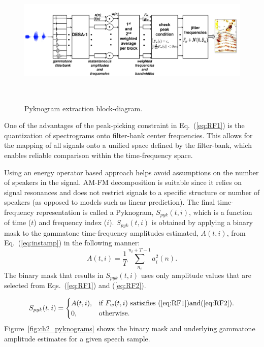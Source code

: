 {\begin{figure}[h!]
	\centering
	\vspace{0mm}
	\includegraphics[height = 2.5in, width=1\textwidth]{figures/pyknogram_blockdiagram}
	\vspace{-3mm}
	\caption{ Pyknogram extraction block-diagram.}
	\label{fig:ch2_pykno_blockdiag}
	\vspace{-3mm}
\end{figure}


One of the advantages of the peak-picking constraint in Eq.~(\ref{eq:RF1}) is the quantization of spectrograms onto filter-bank center frequencies. 
This allows for the mapping of all signals onto a unified space defined by the filter-bank, which enables reliable comparison within the time-frequency space. 

Using an energy operator based approach helps avoid assumptions on the number of speakers in the signal. 
AM-FM decomposition is suitable since it relies on signal resonances and does not restrict signals to a specific structure or number of speakers (as opposed to models such as linear prediction). 
The final time-frequency representation is called a Pyknogram, $S_{pyk}(t,i)$, which is a function of time ($t$) and frequency index ($i$). 
$S_{pyk}(t,i)$ is obtained by applying a binary mask to the gammatone time-frequency amplitudes estimated, $A(t,i)$, from Eq.~(\ref{eq:instamp}) in the following manner:
\begin{equation}
\label{eq:amplitude_spectrum}
A(t,i) = \frac{1}{T}\sum_{n_t}^{n_t+T - 1}a_i^2(n).
\end{equation}
The binary mask that results in $S_{pyk}(t,i)$ uses only amplitude values that are selected from Eqs.~(\ref{eq:RF1}) and (\ref{eq:RF2}). 


\begin{equation}
S_{pyk}(t,i)=\begin{cases}
A(t,i), & \text{if $F_w(t,i)$ satisifies (\ref{eq:RF1})and(\ref{eq:RF2})}.\\
0, & \text{otherwise}.
\end{cases}
\end{equation}
Figure~\ref{fig:ch2_pyknograms} shows the binary mask and underlying gammatone amplitude estimates for a given speech sample. 

}
